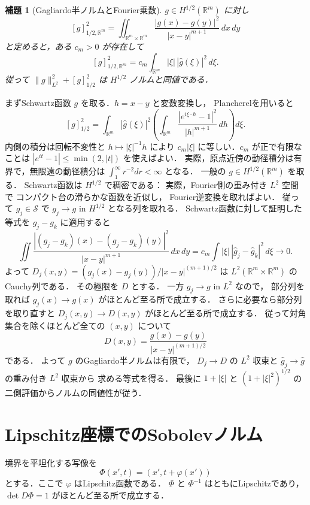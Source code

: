 \documentclass[a5paper,10pt,onecolumn]{jsarticle}
\makeatletter
\theoremstyle{mathnotetheorem}
\newtheorem{lemma}[theorem]{補題}
\renewcommand{\proofname}{証明}
\renewenvironment{proof}[1][\proofname]{%
  \par\pushQED{\qed}\normalfont\topsep4\p@\@plus2\p@\relax
  \trivlist\item[\hskip\labelsep\bfseries #1]\ignorespaces
}{\popQED\endtrivlist\@endpefalse}
\newcommand{\norm}[1]{\lVert #1\rVert}
\makeatother
\begin{document}
\begin{lemma}[Gagliardo半ノルムとFourier乗数]
$g\in H^{1/2}(\mathbb R^m)$ に対し
\[
 [g]_{1/2,\mathbb R^m}^2
 =\iint_{\mathbb R^m\times\mathbb R^m}
    \frac{|g(x)-g(y)|^2}{|x-y|^{m+1}}\,dx\,dy
\]
と定めると，ある $c_m>0$ が存在して
\[
 [g]_{1/2,\mathbb R^m}^2
 =c_m\int_{\mathbb R^m}|\xi|\,|\widehat g(\xi)|^2\,d\xi.
\]
従って $\norm g_{L^2}^2+[g]_{1/2}^2$ は
$H^{1/2}$ ノルムと同値である．
\end{lemma}
\begin{proof}
まずSchwartz函数 $g$ を取る．$h=x-y$ と変数変換し，
Plancherelを用いると
\[
 [g]_{1/2}^2
 =\int_{\mathbb R^m}|\widehat g(\xi)|^2
  \left(\int_{\mathbb R^m}
      \frac{|e^{i\xi\cdot h}-1|^2}{|h|^{m+1}}\,dh\right)d\xi.
\]
内側の積分は回転不変性と $h\mapsto|\xi|^{-1}h$ により
$c_m|\xi|$ に等しい．$c_m$ が正で有限なことは
$|e^{it}-1|\le\min(2,|t|)$ を使えばよい．
実際，原点近傍の動径積分は有界で，無限遠の動径積分は
$\int_1^\infty r^{-2}dr<\infty$ となる．
一般の $g\in H^{1/2}(\mathbb R^m)$ を取る．
Schwartz函数は $H^{1/2}$ で稠密である：
実際，Fourier側の重み付き $L^2$ 空間で
コンパクト台の滑らかな函数を近似し，
Fourier逆変換を取ればよい．
従って $g_j\in\mathcal S$ で
$g_j\to g$ in $H^{1/2}$ となる列を取れる．
Schwartz函数に対して証明した等式を $g_j-g_k$ に適用すると
\[
 \iint
 \frac{|(g_j-g_k)(x)-(g_j-g_k)(y)|^2}{|x-y|^{m+1}}
 \,dx\,dy
 =c_m\int|\xi|\,|\widehat g_j-\widehat g_k|^2\,d\xi
 \longrightarrow0.
\]
よって
$D_j(x,y)=(g_j(x)-g_j(y))/|x-y|^{(m+1)/2}$
は $L^2(\mathbb R^m\times\mathbb R^m)$ のCauchy列である．
その極限を $D$ とする．
一方 $g_j\to g$ in $L^2$ なので，
部分列を取れば $g_j(x)\to g(x)$ がほとんど至る所で成立する．
さらに必要なら部分列を取り直すと
$D_j(x,y)\to D(x,y)$ がほとんど至る所で成立する．
従って対角集合を除くほとんど全ての $(x,y)$ について
\[
 D(x,y)=\frac{g(x)-g(y)}{|x-y|^{(m+1)/2}}
\]
である．
よって $g$ のGagliardo半ノルムは有限で，
$D_j\to D$ の $L^2$ 収束と
$\widehat g_j\to\widehat g$ の重み付き $L^2$ 収束から
求める等式を得る．
最後に $1+|\xi|$ と $(1+|\xi|^2)^{1/2}$ の
二側評価からノルムの同値性が従う．
\end{proof}

\section{Lipschitz座標でのSobolevノルム}
境界を平坦化する写像を
\[
 \Phi(x',t)=(x',t+\varphi(x'))
\]
とする．ここで $\varphi$ はLipschitz函数である．
$\Phi$ と $\Phi^{-1}$ はともにLipschitzであり，
$\det D\Phi=1$ がほとんど至る所で成立する．
\end{document}
